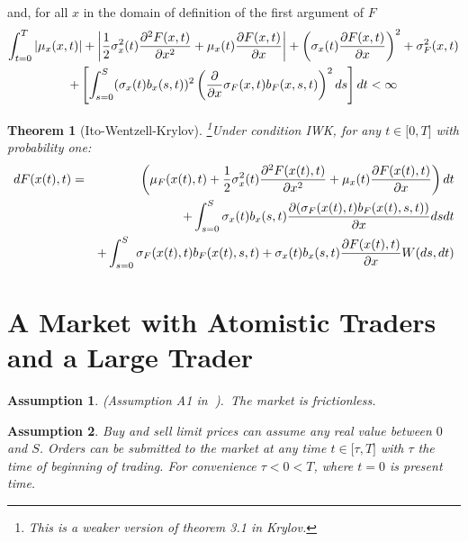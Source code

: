 \documentclass{article}
\newtheorem{theorem}{Theorem}[section]
\newtheorem{assumption}{Assumption}
\begin{document}
\qquad and, for all $x$ in the domain of definition of the first argument of
$F$%
\begin{gather*}
\int_{t=0}^{T}|\mu _{x}(x,t)|+\left|\frac{1}{2}\sigma _{x}^{2}(t)\frac{%
\partial ^{2}F(x,t)}{\partial x^{2}}+\mu _{x}(t)\frac{\partial F(x,t)}{%
\partial x}\right|+\left( \sigma _{x}(t)\frac{\partial F(x,t)}{\partial x}%
\right) ^{2}+\sigma _{F}^{2}(x,t) \\
+\left[\int_{s=0}^{S}(\sigma_{x}(t)b_{x}(s,t))^{2}\left(\frac{\partial }{%
\partial x}\sigma _{F}(x,t)b_{F}(x,s,t)\right)^{2}ds\right]dt<\infty
\end{gather*}


\begin{theorem}[Ito-Wentzell-Krylov]
\footnote{%
This is a weaker version of theorem 3.1 in Krylov.}Under condition IWK, for
any $t\in \lbrack 0,T]$ with probability one:%
\begin{eqnarray}
dF(x(t),t) &=&\left( \mu _{F}(x(t),t)+\frac{1}{2}\sigma _{x}^{2}(t)\frac{%
\partial ^{2}F(x(t),t)}{\partial x^{2}}+\mu _{x}(t)\frac{\partial F(x(t),t)}{%
\partial x}\right) dt  \label{ItoWentzell} \\
&&+\int_{s=0}^{S}\sigma _{x}(t)b_{x}(s,t)\frac{\partial (\sigma
_{F}(x(t),t)b_{F}(x(t),s,t))}{\partial x}dsdt  \notag \\
&&+\int_{s=0}^{S}\sigma _{F}(x(t),t)b_{F}(x(t),s,t)+\sigma _{x}(t)b_{x}(s,t)%
\frac{\partial F(x(t),t)}{\partial x}W(ds,dt)  \notag
\end{eqnarray}
\end{theorem}

\section{A Market with Atomistic Traders and a Large Trader}


\begin{assumption}
\label{ass::market_frictionless} (Assumption A1 in\textbf{\ }\cite{Jar92}).\
The market is frictionless.
\end{assumption}



\begin{assumption}
Buy and sell limit prices can assume any real value between $0$ and $S$.
Orders can be submitted to the market at any time $t\in \mathbb{[\tau },T]$
with $\tau $ the time of beginning of trading. For convenience $\tau <0<T$,
where $t=0$ is present time.
\end{assumption}
\end{document}
